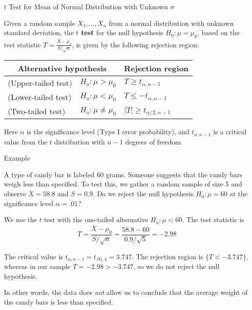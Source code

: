 \documentclass[handout]{beamer}
\renewcommand{\emph}{\textbf}
\begin{document}
\begin{frame}{$t$ Test for Mean of Normal Distribution with Unknown $\sigma$ }
\begin{block}{}
Given a random sample $X_1,\dots,X_n$ from a normal distribution with unknown standard deviation, the \emph{$t$ test} for the null hypothesis $H_0: \mu=\mu_0$, based on the test statistic $T=\frac{\overline X-\mu_0}{S/\sqrt{n}}$, is given by the following rejection region:
\begin{center}
\begin{tabular}{ll|l}
\multicolumn{2}{c}{Alternative hypothesis} & Rejection region \\ \hline
(Upper-tailed test) & $H_a: \mu>\mu_0$ & $T\geq t_{\alpha,n-1}$ \\
(Lower-tailed test) & $H_a: \mu<\mu_0$ & $T\leq -t_{\alpha,n-1}$ \\
(Two-tailed test) & $H_a: \mu\neq\mu_0$ & $|T|\geq t_{\alpha/2,n-1}$\\
\end{tabular}
\end{center}
Here $\alpha$ is the significance level (Type I error probability), and $t_{\alpha,n-1}$ is a critical value from the $t$ distribution with $n-1$ degrees of freedom.
\end{block}
\end{frame}

\begin{frame}{Example}
\begin{block}{}
A type of candy bar is labeled 60 grams. Someone suggests that the candy bars weigh less than specified. To test this, we gather a random sample of size 5 and observe $\overline X=58.8$ and $S=0.9$. Do we reject the null hypothesis $H_0: \mu=60$ at the significance level $\alpha=.01$?
\end{block}

\pause We use the $t$ test with the one-tailed alternative $H_a: \mu<60$. The test statistic  is
$$T=\frac{\overline X-\mu_0}{S/\sqrt{n}}=\frac{58.8-60}{0.9/\sqrt{5}}=-2.98$$

\vspace{.2cm} 
\pause The critical value is $t_{\alpha,n-1}=t_{.01,4}=3.747$. The rejection region is $\{T < -3.747\}$, whereas in our sample $T=-2.98>-3.747$, so we do not reject the null hypothesis.

\vspace{.2cm}
\pause In other words, the data does \textit{not} allow us to conclude that the average weight of the candy bars is less than specified.
\end{frame}
\end{document}
